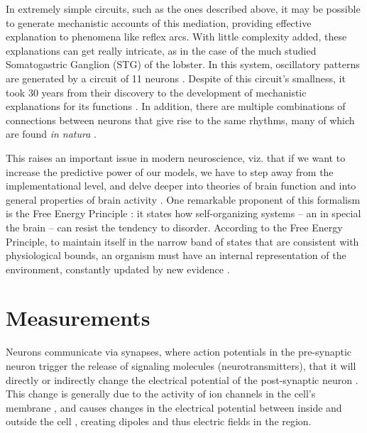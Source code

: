     In extremely simple circuits, such as the ones described above, it may be possible to generate mechanistic accounts of this mediation, providing effective explanation to phenomena like reflex arcs. With little complexity added, these explanations can get really intricate, as in the case of the much studied Somatogastric Ganglion (STG) of the lobster. In this system, oscillatory patterns are generated by a circuit of 11 neurons \cite{selverston2009neural}. Despite of this circuit's smallness, it took 30 years from their discovery to the development of mechanistic explanations for its functions \cite{bal1988pyloric, selverston2009neural}. In addition, there are multiple combinations of connections between neurons that give rise to the same rhythms, many of which are found \textit{in natura} \cite{prinz2004similar}. 
    
    
    This raises an important issue in modern neuroscience, viz. that if we want to increase the predictive power of our models, we have to step away from the implementational level, and delve deeper into theories of brain function and into general properties of brain activity \cite{gerstner2012theory}. One remarkable proponent of this formalism is the Free Energy Principle \cite{friston2009free}: it states how self-organizing systems -- an in special the brain -- can resist the tendency to disorder. According to the Free Energy Principle, to maintain itself in the narrow band of states that are consistent with physiological bounds, an organism must have an internal representation of the environment, constantly updated by new evidence \cite{friston2009free}.

\section{Measurements}
    Neurons communicate via synapses, where action potentials in the pre-synaptic neuron trigger the release of signaling molecules (neurotransmitters), that it will directly or indirectly change the electrical potential of the post-synaptic neuron \cite{purves2014neuroscience}. This change is generally due to the activity of ion channels in the cell's membrane \cite{purves2014neuroscience}, and causes changes in the electrical potential between inside and outside the cell \cite{purves2014neuroscience}, creating dipoles and thus electric fields in the region.
    
